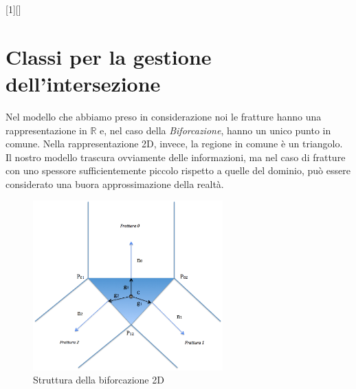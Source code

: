 [1][]{}{}

\chapter{Classi per la gestione dell'intersezione}

Nel modello che abbiamo preso in considerazione noi le fratture hanno una rappresentazione in $\mathbb{R}$ e, nel caso della \textit{Biforcazione}, hanno un unico punto in comune. 
Nella rappresentazione 2D, invece, la regione in comune è un triangolo. \\
Il nostro modello trascura ovviamente delle informazioni, ma nel caso di fratture con uno spessore sufficientemente piccolo rispetto a quelle del dominio, può essere considerato una buora approssimazione della realtà.\\

\begin{figure}[htbp]
\centering
\includegraphics[width=0.65\textwidth]{img/TriangoloBiforcazione.eps}
\caption{Struttura della biforcazione 2D}\label{Biforcazione}
\end{figure}

